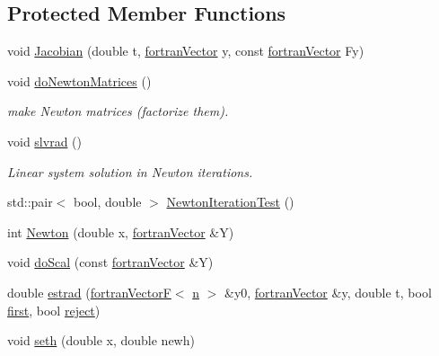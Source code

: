 \subsection*{Protected Member Functions}
\begin{DoxyCompactItemize}
\item 
void \hyperlink{classodes_1_1Radau5cc_a488b0601e6404991edfab78e4a2957e4}{Jacobian} (double t, \hyperlink{classodes_1_1fortranVector}{fortran\+Vector} y, const \hyperlink{classodes_1_1fortranVector}{fortran\+Vector} Fy)
\item 
void \hyperlink{classodes_1_1Radau5cc_ad0fe2959c9f23fcd76029cc54533ad07}{do\+Newton\+Matrices} ()
\begin{DoxyCompactList}\small\item\em make Newton matrices (factorize them). \end{DoxyCompactList}\item 
void \hyperlink{classodes_1_1Radau5cc_a78b4b4f6a4adb0d2de7dbbb0f841d082}{slvrad} ()
\begin{DoxyCompactList}\small\item\em Linear system solution in Newton iterations. \end{DoxyCompactList}\item 
std\+::pair$<$ bool, double $>$ \hyperlink{classodes_1_1Radau5cc_ac6b74a8cf1d2fdc83c8fec8189bd1d42}{Newton\+Iteration\+Test} ()
\item 
int \hyperlink{classodes_1_1Radau5cc_a7a78640ed38b67431551584da7cdbc09}{Newton} (double x, \hyperlink{classodes_1_1fortranVector}{fortran\+Vector} \&Y)
\item 
void \hyperlink{classodes_1_1Radau5cc_a2e6e502fa601a91fd32df312d6db47e2}{do\+Scal} (const \hyperlink{classodes_1_1fortranVector}{fortran\+Vector} \&Y)
\item 
double \hyperlink{classodes_1_1Radau5cc_a30bad88ca054d7dcf430a5d352a23d38}{estrad} (\hyperlink{classodes_1_1fortranVectorF}{fortran\+Vector\+F}$<$ \hyperlink{classodes_1_1Radau5cc_a3be3f05d2cdf7268e7d09b62ad9ad494}{n} $>$ \&y0, \hyperlink{classodes_1_1fortranVector}{fortran\+Vector} \&y, double t, bool \hyperlink{classodes_1_1Radau5cc_a788454a3dee88b6547430e881856fec7}{first}, bool \hyperlink{classodes_1_1Radau5cc_aedacfeb52f4072557c312adf7817bcf6}{reject})
\item 
void \hyperlink{classodes_1_1Radau5cc_aca7a11800037ae39edd9a6d644317653}{seth} (double x, double newh)
\end{DoxyCompactItemize}
